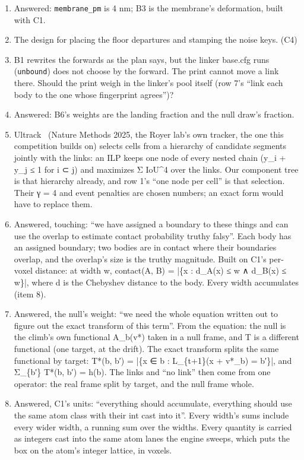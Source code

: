\begin{enumerate}
\item Answered: \texttt{membrane\_\allowbreak{}pm} is 4 nm; B3 is the membrane's deformation, built with C1.
\item The design for placing the floor departures and stamping the noise keys. (C4)
\item B1 rewrites the forwards as the plan says, but the linker base.cfg runs (\texttt{unbound}) does not choose by the forward. The print cannot move a link there. Should the print weigh in the linker's pool itself (row 7's “link each body to the one whose fingerprint agrees”)?
\item Answered: B6's weights are the landing fraction and the null draw's fraction.
\item Ultrack~\cite{src:Ultrack} (Nature Methods 2025, the Royer lab's own tracker, the one this competition builds on) selects cells from a hierarchy of candidate segments jointly with the links: an ILP keeps one node of every nested chain (y\_\allowbreak{}i + y\_\allowbreak{}j ≤ 1 for i ⊂ j) and maximizes Σ IoU\textasciicircum{}4 over the links. Our component tree is that hierarchy already, and row 1's “one node per cell” is that selection. Their γ = 4 and event penalties are chosen numbers; an exact form would have to replace them.
\item Answered, touching: “we have assigned a boundary to these things and can use the overlap to estimate contact probability truthy falsy”. Each body has an assigned boundary; two bodies are in contact where their boundaries overlap, and the overlap's size is the truthy magnitude. Built on C1's per-voxel distance: at width w, contact(A, B) = |\{x : d\_\allowbreak{}A(x) ≤ w ∧ d\_\allowbreak{}B(x) ≤ w\}|, where d is the Chebyshev distance to the body. Every width accumulates (item 8).
\item Answered, the null's weight: “we need the whole equation written out to figure out the exact transform of this term”. From the equation: the null is the climb's own functional A\_\allowbreak{}b(v*) taken in a null frame, and T is a different functional (one target, at the drift). The exact transform splits the same functional by target: T*(b, b′) = |\{x ∈ b : L\_\allowbreak{}\{t+1\}(x + v*\_\allowbreak{}b) = b′\}|, and Σ\_\allowbreak{}\{b′\} T*(b, b′) = h(b). The links and “no link” then come from one operator: the real frame split by target, and the null frame whole.
\item Answered, C1's units: “everything should accumulate, everything should use the same atom class with their int cast into it”. Every width's sums include every wider width, a running sum over the widths. Every quantity is carried as integers cast into the same atom lanes the engine sweeps, which puts the box on the atom's integer lattice, in voxels.

\end{enumerate}
